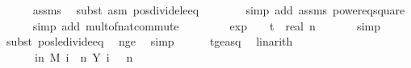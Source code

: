 \begin{isabellebody}
\ \ \ \ \isamarkupfalse%
\ assms{\isacharparenleft}{\kern0pt}{}{\isacharparenright}{\kern0pt}\ \isamarkupfalse%
\ {\isacharparenleft}{\kern0pt}subst\ {\isacharparenleft}{\kern0pt}asm{\isacharparenright}{\kern0pt}\ pos{\isacharunderscore}{\kern0pt}divide{\isacharunderscore}{\kern0pt}le{\isacharunderscore}{\kern0pt}eq{\isacharparenright}{\kern0pt}\ \isanewline
\ \ \ \ \ \isamarkupfalse%
\ {\isacharparenleft}{\kern0pt}simp\ add{\isacharcolon}{\kern0pt}\ assms{\isacharparenleft}{\kern0pt}{}{\isacharparenright}{\kern0pt}\ power{}{\isacharunderscore}{\kern0pt}eq{\isacharunderscore}{\kern0pt}square{\isacharparenright}{\kern0pt}\isanewline
\ \ \ \ \isamarkupfalse%
\ {\isacharparenleft}{\kern0pt}simp\ add{\isacharcolon}{\kern0pt}\ mult{\isacharunderscore}{\kern0pt}of{\isacharunderscore}{\kern0pt}nat{\isacharunderscore}{\kern0pt}commute{\isacharparenright}{\kern0pt}\isanewline
\ \ \isamarkupfalse%
\ \isamarkupfalse%
\ {\isachardoublequoteopen}{\isachardot}{\kern0pt}{\isachardot}{\kern0pt}{\isachardot}{\kern0pt}\ {\isasymle}\ {}{\isacharminus}{\kern0pt}\ exp\ {\isacharparenleft}{\kern0pt}{\isacharminus}{\kern0pt}\ {\isacharparenleft}{\kern0pt}{}\ {\isacharasterisk}{\kern0pt}\ t\ {\isacharslash}{\kern0pt}\ real\ n{\isacharparenright}{\kern0pt}{\isacharparenright}{\kern0pt}{\isachardoublequoteclose}\ \isanewline
\ \ \ \ \isamarkupfalse%
\ simp\isanewline
\ \ \ \ \isamarkupfalse%
\ {\isacharparenleft}{\kern0pt}subst\ pos{\isacharunderscore}{\kern0pt}le{\isacharunderscore}{\kern0pt}divide{\isacharunderscore}{\kern0pt}eq{\isacharparenright}{\kern0pt}\ \isamarkupfalse%
\ n{\isacharunderscore}{\kern0pt}ge{\isacharunderscore}{\kern0pt}{}\ \isamarkupfalse%
\ simp\isanewline
\ \ \ \ \isamarkupfalse%
\ t{\isacharunderscore}{\kern0pt}ge{\isacharunderscore}{\kern0pt}a{\isacharunderscore}{\kern0pt}sq\ \isamarkupfalse%
\ linarith\isanewline
\ \ \isamarkupfalse%
\ \isamarkupfalse%
\ {\isachardoublequoteopen}{\isachardot}{\kern0pt}{\isachardot}{\kern0pt}{\isachardot}{\kern0pt}\ {\isasymle}\ {}\ {\isacharminus}{\kern0pt}\ {\isasymP}{\isacharparenleft}{\kern0pt}{\isasymomega}\ in\ M{\isachardot}{\kern0pt}\ {\isacharparenleft}{\kern0pt}{\isasymSum}i\ {\isacharequal}{\kern0pt}\ {}{\isachardot}{\kern0pt}{\isachardot}{\kern0pt}{\isacharless}{\kern0pt}n{\isachardot}{\kern0pt}\ Y\ i\ {\isasymomega}{\isacharparenright}{\kern0pt}\ {\isasymle}\ n{\isacharslash}{\kern0pt}{}{\isacharparenright}{\kern0pt}{\isachardoublequoteclose}\ \isanewline

\end{isabellebody}
